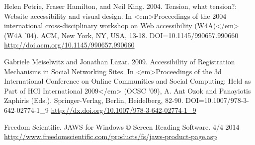 \documentclass[conference]{IEEEtran}
\begin{document}
\begin{thebibliography}{1}
Helen Petrie, Fraser Hamilton, and Neil King. 2004. Tension, what tension?:
Website accessibility and visual design. In <em>Proceedings of the 2004
international cross-disciplinary workshop on Web accessibility (W4A)</em> (W4A
'04). ACM, New York, NY, USA, 13-18. DOI=10.1145/990657.990660
\href{http://doi.acm.org/10.1145/990657.990660}{http://doi.acm.org/10.1145/990657.990660}

Gabriele Meiselwitz and Jonathan Lazar. 2009. Accessibility of Registration
Mechanisms in Social Networking Sites. In <em>Proceedings of the 3d
International Conference on Online Communities and Social Computing: Held as
Part of HCI International 2009</em> (OCSC '09), A. Ant Ozok and Panayiotis
Zaphiris (Eds.). Springer-Verlag, Berlin, Heidelberg, 82-90.
DOI=10.1007/978-3-642-02774-1\_9 \href{http://dx.doi.org/10.1007/978-3-642-02774-1\_9}{http://dx.doi.org/10.1007/978-3-642-02774-1\_9}

Freedom Scientific. JAWS for Windows ® Screen Reading Software. 4/4 2014
\href{http://www.freedomscientific.com/products/fs/jaws-product-page.asp}{http://www.freedomscientific.com/products/fs/jaws-product-page.asp}


\end{thebibliography}
\end{document}
